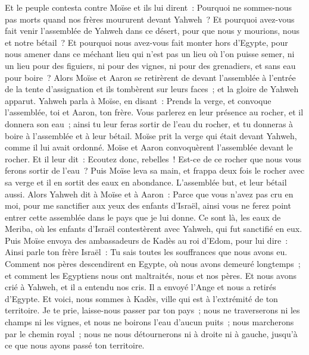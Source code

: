 \begin{multicols}{2}
Et le peuple contesta contre Moïse et ils lui dirent~: Pourquoi ne sommes-nous pas morts quand nos frères moururent devant Yahweh~?
Et pourquoi avez-vous fait venir l'assemblée de Yahweh dans ce désert, pour que nous y mourions, nous et notre bétail~?
Et pourquoi nous avez-vous fait monter hors d'Egypte, pour nous amener dans ce méchant lieu qui n'est pas un lieu où l'on puisse semer, ni un lieu pour des figuiers, ni pour des vignes, ni pour des grenadiers, et sans eau pour boire~?
Alors Moïse et Aaron se retirèrent de devant l'assemblée à l'entrée de la tente d'assignation et ils tombèrent sur leurs faces~; et la gloire de Yahweh apparut.
Yahweh parla à Moïse, en disant~:
Prends la verge, et convoque l'assemblée, toi et Aaron, ton frère. Vous parlerez en leur présence au rocher, et il donnera son eau~; ainsi tu leur feras sortir de l'eau du rocher, et tu donneras à boire à l'assemblée et à leur bétail.
Moïse prit la verge qui était devant Yahweh, comme il lui avait ordonné.
Moïse et Aaron convoquèrent l'assemblée devant le rocher. Et il leur dit~: Ecoutez donc, rebelles~! Est-ce de ce rocher que nous vous ferons sortir de l'eau~?
Puis Moïse leva sa main, et frappa deux fois le rocher avec sa verge et il en sortit des eaux en abondance. L'assemblée but, et leur bétail aussi.
Alors Yahweh dit à Moïse et à Aaron~: Parce que vous n'avez pas cru en moi, pour me sanctifier aux yeux des enfants d'Israël, ainsi vous ne ferez point entrer cette assemblée dans le pays que je lui donne.
Ce sont là, les eaux de Meriba, où les enfants d'Israël contestèrent avec Yahweh, qui fut sanctifié en eux.
Puis Moïse envoya des ambassadeurs de Kadès au roi d'Edom, pour lui dire~: Ainsi parle ton frère Israël~: Tu sais toutes les souffrances que nous avons eu.
Comment nos pères descendirent en Egypte, où nous avons demeuré longtemps~; et comment les Egyptiens nous ont maltraités, nous et nos pères.
Et nous avons crié à Yahweh, et il a entendu nos cris. Il a envoyé l'Ange et nous a retirés d'Egypte. Et voici, nous sommes à Kadès, ville qui est à l'extrémité de ton territoire.
Je te prie, laisse-nous passer par ton pays~; nous ne traverserons ni les champs ni les vignes, et nous ne boirons l'eau d'aucun puits~; nous marcherons par le chemin royal~; nous ne nous détournerons ni à droite ni à gauche, jusqu'à ce que nous ayons passé ton territoire.

\end{multicols}

